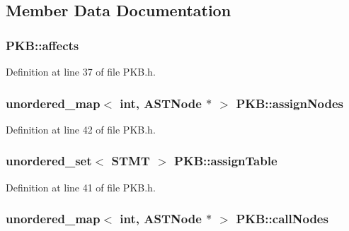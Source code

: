 \subsection{Member Data Documentation}
\hypertarget{class_p_k_b_ad9d778faa5c6d938082d07d90da6fea0}{
\subsubsection[{affects}]{ P\-K\-B\-::affects\hspace{0.3cm}{\ttfamily [static]}}}\label{class_p_k_b_ad9d778faa5c6d938082d07d90da6fea0}


Definition at line 37 of file P\-K\-B.\-h.

\hypertarget{class_p_k_b_a4bed7a639eeaebec0f877429f1b73079}{
\subsubsection[{assign\-Nodes}]{\setlength{\rightskip}{0pt plus 5cm}unordered\-\_\-map$<$ int, {\bf A\-S\-T\-Node} $\ast$ $>$ P\-K\-B\-::assign\-Nodes\hspace{0.3cm}{\ttfamily [static]}}}\label{class_p_k_b_a4bed7a639eeaebec0f877429f1b73079}


Definition at line 42 of file P\-K\-B.\-h.

\hypertarget{class_p_k_b_a616513239f3fa6971424332dfabe0ead}{
\subsubsection[{assign\-Table}]{\setlength{\rightskip}{0pt plus 5cm}unordered\-\_\-set$<$ {\bf S\-T\-M\-T} $>$ P\-K\-B\-::assign\-Table\hspace{0.3cm}{\ttfamily [static]}}}\label{class_p_k_b_a616513239f3fa6971424332dfabe0ead}


Definition at line 41 of file P\-K\-B.\-h.

\hypertarget{class_p_k_b_a54cdb3a6553fd54b689a812d3187ccce}{
\subsubsection[{call\-Nodes}]{\setlength{\rightskip}{0pt plus 5cm}unordered\-\_\-map$<$ int, {\bf A\-S\-T\-Node} $\ast$ $>$ P\-K\-B\-::call\-Nodes\hspace{0.3cm}{\ttfamily [static]}}}\label{class_p_k_b_a54cdb3a6553fd54b689a812d3187ccce}


